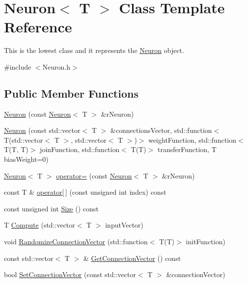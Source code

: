 \hypertarget{class_neuron}{\section{Neuron$<$ T $>$ Class Template Reference}
\label{class_neuron}
}


This is the lowest class and it represents the \hyperlink{class_neuron}{Neuron} object.  




{\ttfamily \#include $<$Neuron.\-h$>$}

\subsection*{Public Member Functions}
\begin{DoxyCompactItemize}
\item 
\hyperlink{class_neuron_a54a06b1dd7b89dd044cd14a406ff78a4}{Neuron} (const \hyperlink{class_neuron}{Neuron}$<$ T $>$ \&r\-Neuron)
\item 
\hyperlink{class_neuron_affff6501384d5b775d82b256fa890e54}{Neuron} (const std\-::vector$<$ T $>$ \&connections\-Vector, std\-::function$<$ T(std\-::vector$<$ T $>$, std\-::vector$<$ T $>$)$>$ weight\-Function, std\-::function$<$ T(T, T)$>$ join\-Function, std\-::function$<$ T(T)$>$ transfer\-Function, T bias\-Weight=0)
\item 
\hyperlink{class_neuron}{Neuron}$<$ T $>$ \hyperlink{class_neuron_a7c3dca11875d3750232572b9dbaa3f92}{operator=} (const \hyperlink{class_neuron}{Neuron}$<$ T $>$ \&r\-Neuron)
\item 
const T \& \hyperlink{class_neuron_a1d18d688f5f310ec29f93c38b9d5e6e3}{operator\mbox{[}$\,$\mbox{]}} (const unsigned int index) const 
\item 
const unsigned int \hyperlink{class_neuron_a58d46a89339b5d1a2987159d56adaeca}{Size} () const 
\item 
T \hyperlink{class_neuron_a38bba6f81fde2ce7df32372cade0fb87}{Compute} (std\-::vector$<$ T $>$ input\-Vector)
\item 
void \hyperlink{class_neuron_af98248f8266d73307ff2b6820038a0c4}{Randomize\-Connection\-Vector} (std\-::function$<$ T(T)$>$ init\-Function)
\item 
const std\-::vector$<$ T $>$ \& \hyperlink{class_neuron_a9090ebb7bbaea65059bbdb0b2d01e004}{Get\-Connection\-Vector} () const 
\item 
bool \hyperlink{class_neuron_a535b1f8371c08845f0b2a6a2cb35e869}{Set\-Connection\-Vector} (const std\-::vector$<$ T $>$ \&connection\-Vector)

\end{DoxyCompactItemize}
